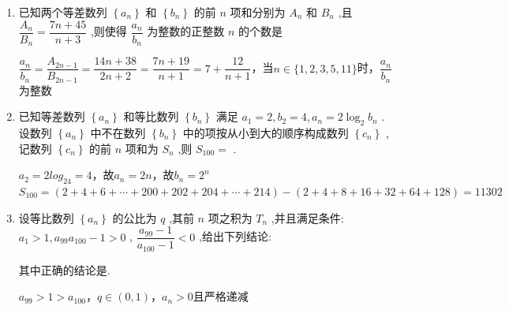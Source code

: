 \begin{enumerate}
\begin{jieda}
        设$f(x) = \dfrac{1-q^{x+1}}{x(x+2)}$，当$x \geq 2$时$f(x+1) < f(x)$，故$r = 1, t = 2$，$\dfrac{1-q^{3}}{8}= \dfrac{1-q^2}{3}$，解得$q = \dfrac{5+\sqrt{85}}{6}$
    \end{jieda}
    \item 已知两个等差数列 $\left\{  {a}_{n}\right\}$ 和 $\left\{  {b}_{n}\right\}$ 的前 $n$ 项和分别为 ${A}_{n}$ 和 ${B}_{n}$ ,且 $\dfrac{{A}_{n}}{{B}_{n}} = \dfrac{{7n} + {45}}{n + 3}$ ,则使得 $\dfrac{{a}_{n}}{{b}_{n}}$ 为整数的正整数 $n$ 的个数是
    \begin{jieda}
        $\dfrac{a_n}{b_n} = \dfrac{A_{2n-1}}{B_{2n-1}} = \dfrac{14n+38}{2n+2} = \dfrac{7n+19}{n+1} = 7 + \dfrac{12}{n+1}$，当$n \in \{1,2,3,5,11\}$时，$\dfrac{{a}_{n}}{{b}_{n}}$ 为整数
    \end{jieda}
    \item 已知等差数列 $\left\{  {a}_{n}\right\}$ 和等比数列 $\left\{  {b}_{n}\right\}$ 满足 ${a}_{1} = 2,{b}_{2} = 4,{a}_{n} = 2{\log }_{2}{b}_{n}$ . 设数列 $\left\{  {a}_{n}\right\}$ 中不在数列 $\left\{  {b}_{n}\right\}$ 中的项按从小到大的顺序构成数列 $\left\{  {c}_{n}\right\}$ ,记数列 $\left\{  {c}_{n}\right\}$ 的前 $n$ 项和为 ${S}_{n}$ ,则 ${S}_{100} =$ .
    \begin{jieda}
        $a_2 = 2log_24 = 4$，故$a_n = 2n$，故$b_n = 2^n$
        $S_{100} = (2 + 4 + 6 + \cdots  + 200 + 202 + 204 + \cdots  + 214) - (2+4+8+16+32+64+128) = 11302$
    \end{jieda}
    \item 设等比数列 $\left\{  {a}_{n}\right\}$ 的公比为 $q$ ,其前 $n$ 项之积为 ${T}_{n}$ ,并且满足条件: ${a}_{1} > 1,{a}_{99}{a}_{100} - 1 > 0$ , $\dfrac{{a}_{99} - 1}{{a}_{100} - 1} < 0$ ,给出下列结论:
    其中正确的结论是.
    \begin{jieda}
        $a_{99} > 1 > a_{100}$，$q \in (0, 1)$，$a_n > 0$且严格递减
    \end{jieda}
\end{enumerate}

